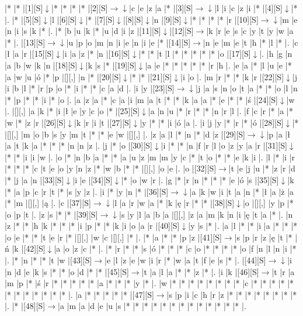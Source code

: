\documentclass[11pt]{article}
\newcommand\drarr{$\rightarrow \!\!\!\!\! \downarrow$}
\newcommand\rarr{$\rightarrow$}
\newcommand\darr{$\downarrow$}
\begin{document}
\noindent\begin{Puzzle}{21}{31}|*	|*	|[1][S]\darr	|*	|*	|*	|*	|[2][S]\drarr	|c	|e	|z	|a	|*	|[3][S]\drarr	|l	|i	|c	|z	|i	|*	|[4][S]\darr	|*	|.
|*	|[5][S]\darr	|l	|[6][S]\darr	|*	|[7][S]\darr	|[8][S]\darr	|n	|[9][S]\darr	|*	|*	|*	|*	|r	|[10][S]\drarr	|m	|e	|n	|i	|s	|k	|*	|.
|*	|b	|u	|k	|*	|u	|d	|i	|z	|[11][S]\darr	|[12][S]\rarr	|k	|r	|e	|s	|c	|y	|t	|y	|w	|a	|*	|.
|[13][S]\drarr	|u	|p	|o	|m	|n	|i	|e	|n	|i	|e	|*	|[14][S]\rarr	|n	|e	|m	|e	|t	|h	|*	|l	|*	|.
|c	|ł	|a	|r	|[15][S]\darr	|i	|a	|z	|*	|n	|[16][S]\darr	|*	|*	|t	|l	|*	|*	|*	|*	|*	|o	|[17][S]\darr	|.
|h	|g	|n	|a	|b	|w	|k	|n	|[18][S]\darr	|k	|s	|*	|[19][S]\darr	|a	|e	|*	|*	|*	|*	|*	|r	|h	|.
|e	|a	|*	|l	|u	|e	|*	|a	|w	|u	|ó	|*	|p	|[][,]{ }	|n	|*	|[20][S]\darr	|*	|*	|[21][S]\darr	|i	|o	|.
|m	|r	|*	|*	|k	|r	|[22][S]\darr	|j	|i	|b	|l	|*	|r	|p	|o	|*	|i	|*	|*	|c	|a	|d	|.
|i	|y	|[23][S]\drarr	|j	|a	|s	|n	|o	|t	|a	|*	|*	|o	|l	|n	|*	|p	|*	|*	|i	|*	|o	|.
|a	|z	|a	|*	|c	|a	|i	|m	|a	|t	|*	|*	|k	|a	|a	|*	|e	|*	|*	|ś	|[24][S]\darr	|w	|.
|[][,]{ }	|a	|k	|*	|i	|ł	|e	|y	|c	|o	|*	|[25][S]\darr	|a	|n	|u	|*	|r	|*	|*	|n	|r	|l	|.
|f	|c	|r	|*	|a	|*	|w	|*	|z	|r	|[26][S]\darr	|k	|r	|i	|t	|[27][S]\darr	|y	|*	|*	|i	|ó	|a	|.
|i	|j	|y	|*	|r	|*	|ó	|[28][S]\darr	|*	|[][,]{ }	|m	|o	|b	|s	|y	|m	|t	|*	|*	|e	|w	|[][,]{ }	|.
|z	|a	|l	|*	|n	|*	|d	|z	|[29][S]\drarr	|p	|a	|ł	|a	|t	|k	|a	|*	|*	|*	|n	|n	|z	|.
|j	|*	|o	|[30][S]\darr	|i	|*	|*	|n	|f	|r	|l	|o	|z	|y	|a	|r	|[31][S]\darr	|*	|*	|i	|i	|w	|.
|o	|*	|n	|b	|a	|*	|*	|a	|u	|z	|m	|m	|y	|c	|*	|t	|o	|*	|*	|e	|k	|i	|.
|l	|*	|i	|r	|*	|*	|*	|c	|t	|e	|o	|y	|n	|z	|*	|w	|b	|*	|*	|[][,]{ }	|o	|e	|.
|o	|[32][S]\rarr	|t	|e	|j	|u	|*	|z	|r	|d	|*	|j	|a	|n	|[33][S]\darr	|i	|e	|[34][S]\darr	|*	|o	|w	|r	|.
|g	|*	|r	|n	|*	|*	|*	|e	|ó	|s	|[35][S]\darr	|k	|*	|a	|p	|c	|r	|t	|*	|s	|y	|z	|.
|i	|*	|y	|n	|*	|[36][S]\drarr	|a	|k	|w	|i	|t	|a	|n	|*	|ł	|a	|ż	|a	|*	|m	|[][,]{ }	|ą	|.
|c	|[37][S]\drarr	|l	|a	|r	|w	|a	|*	|k	|ę	|r	|*	|*	|[38][S]\darr	|o	|[][,]{ }	|y	|p	|*	|o	|p	|t	|.
|z	|s	|*	|*	|[39][S]\drarr	|s	|y	|l	|a	|b	|a	|[][,]{ }	|z	|a	|m	|k	|n	|i	|ę	|t	|a	|*	|.
|n	|z	|*	|*	|h	|k	|*	|*	|*	|i	|p	|*	|*	|k	|i	|o	|a	|r	|[40][S]\darr	|y	|s	|*	|.
|a	|l	|*	|*	|i	|a	|*	|*	|*	|o	|e	|*	|*	|t	|e	|r	|*	|[][,]{ }	|w	|c	|[][,]{ }	|*	|.
|*	|a	|*	|*	|p	|z	|[41][S]\rarr	|s	|p	|r	|z	|ę	|t	|*	|ń	|k	|[42][S]\darr	|a	|o	|z	|c	|*	|.
|*	|r	|*	|*	|s	|ó	|*	|*	|*	|c	|o	|*	|*	|*	|*	|o	|f	|n	|l	|n	|i	|*	|.
|*	|n	|*	|*	|t	|w	|[43][S]\rarr	|e	|l	|z	|e	|w	|i	|r	|*	|w	|a	|t	|f	|e	|s	|*	|.
|[44][S]\drarr	|i	|n	|d	|e	|k	|s	|*	|*	|o	|d	|*	|*	|[45][S]\rarr	|t	|a	|l	|a	|*	|*	|z	|*	|.
|i	|k	|[46][S]\rarr	|t	|r	|a	|m	|p	|*	|ś	|r	|*	|*	|*	|*	|*	|a	|*	|*	|*	|y	|*	|.
|w	|*	|*	|*	|*	|*	|*	|*	|*	|c	|*	|*	|*	|*	|*	|*	|*	|*	|*	|*	|*	|*	|.
|a	|*	|*	|*	|*	|*	|[47][S]\rarr	|s	|p	|i	|c	|h	|r	|z	|*	|*	|*	|*	|*	|*	|*	|*	|.
|*	|[48][S]\rarr	|a	|m	|a	|d	|e	|u	|s	|*	|*	|*	|*	|*	|*	|*	|*	|*	|*	|*	|*	|*	|.\end{Puzzle}
\end{document}
